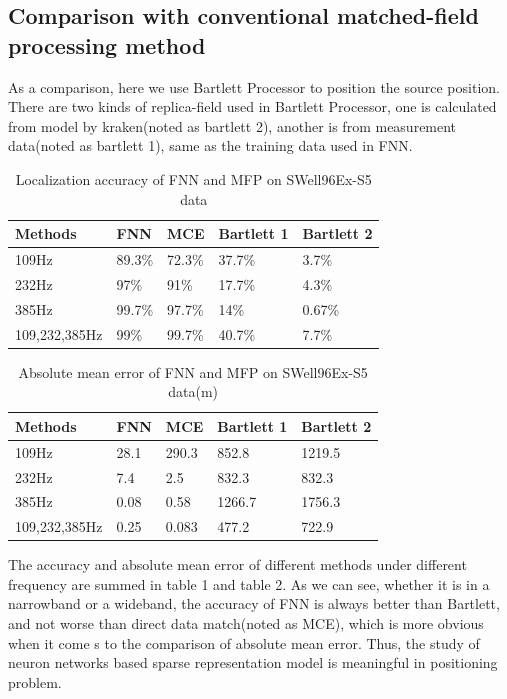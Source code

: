 \subsection{Comparison with conventional matched-field processing method}
As a comparison, here we use Bartlett Processor to position the source position. There are two kinds of replica-field used in Bartlett Processor, one is calculated from model by kraken(noted as bartlett 2), another is from measurement data(noted as bartlett 1), same as the training data used in FNN.
\begin{table}[]
\caption{Localization accuracy of FNN and MFP on SWell96Ex-S5 data}
\label{my-label}
\begin{tabular}{@{}lllll@{}}
\toprule
Methods       & FNN    & MCE    & Bartlett 1 & Bartlett 2 \\ \midrule
109Hz         & 89.3\% & 72.3\% & 37.7\%     & 3.7\%      \\
232Hz         & 97\%   & 91\%   & 17.7\%     & 4.3\%      \\
385Hz         & 99.7\% & 97.7\% & 14\%       & 0.67\%     \\
109,232,385Hz & 99\%   & 99.7\% & 40.7\%     & 7.7\%      \\ \bottomrule
\end{tabular}
\end{table}

\begin{table}[]
\caption{Absolute mean error of FNN and MFP on SWell96Ex-S5 data(m)}
\label{my-label}
\begin{tabular}{@{}lllll@{}}
\toprule
Methods       & FNN  & MCE   & Bartlett 1 & Bartlett 2 \\ \midrule
109Hz         & 28.1 & 290.3 & 852.8      & 1219.5     \\
232Hz         & 7.4  & 2.5   & 832.3      & 832.3      \\
385Hz         & 0.08 & 0.58  & 1266.7     & 1756.3     \\
109,232,385Hz & 0.25 & 0.083 & 477.2      & 722.9      \\ \bottomrule
\end{tabular}
\end{table}

The accuracy and absolute mean error of different methods under different frequency are summed in table 1 and table 2. As we can see, whether it is in a narrowband or a wideband, the accuracy of FNN is always better than Bartlett, and not worse than direct data match(noted as MCE), which is more obvious when it come s to the comparison of absolute mean error. Thus, the study of neuron networks based sparse representation model is meaningful in positioning problem.

